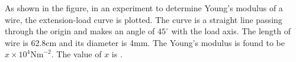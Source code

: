 \item As shown in the figure, in an experiment to determine Young’s modulus of a wire, the extension-load curve is plotted. The curve is a straight line passing through the origin and makes an angle of \(45^\circ\) with the load axis. The length of wire is 62.8cm and its diameter is 4mm. The Young’s modulus is found to be \(x \times 10^4 \text{Nm}^{-2}\). The value of \(x\) is \underline{\hspace{2.5cm}}.
    \begin{center}
    \end{center}